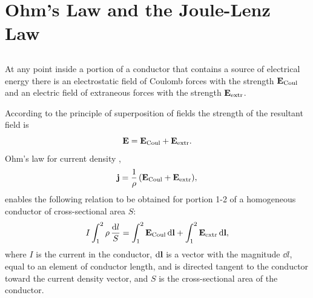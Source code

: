 \section{Ohm's Law and the Joule-Lenz Law}
\label{sec-21.2}


\subsection{}\label{21.2.1} At any point inside a portion of a conductor that contains a source of electrical energy there is an electrostatic field of Coulomb forces with the strength $\vb{E}_{\text{Coul}}$ and an electric field of extraneous forces with the strength $\vb{E}_{\text{extr}}$.

According to the principle of superposition of fields 
 the strength of the resultant field is
\begin{equation*}
\vb{E} = \vb{E}_{\text{Coul}} + \vb{E}_{\text{extr}}.
\end{equation*}
Ohm's law for current density ,
\begin{equation*}
\vb{j} = \frac{1}{\rho} \, (\vb{E}_{\text{Coul}} + \vb{E}_{\text{extr}}),
\end{equation*}
enables the following relation to be obtained for portion 1-2 of a homogeneous conductor of cross-sectional area $S$:
\begin{equation*}
I \int_{1}^{2} \rho \, \frac{\dd l}{S}  = \int_{1}^{2} \vb{E}_{\text{Coul}} \, \dd \vb{l} + \int_{1}^{2} \vb{E}_{\text{extr}} \, \dd \vb{l} ,
\end{equation*}
where $I$ is the current in the conductor, $\dd \vb{l}$ is a vector with the magnitude $\dd l$, equal to an element of conductor length, and is directed tangent to the conductor toward the current density vector, and $S$ is the cross-sectional area of the conductor.


\subsection{}\label{21.2.2} 

